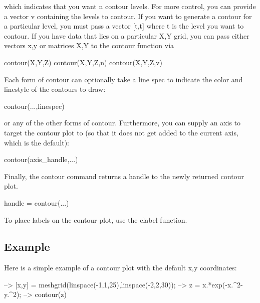  which indicates that you want {\ttfamily n} contour levels. For more control, you can provide a vector {\ttfamily v} containing the levels to contour. If you want to generate a contour for a particular level, you must pass a vector {\ttfamily \mbox{[}t,t\mbox{]}} where {\ttfamily t} is the level you want to contour. If you have data that lies on a particular {\ttfamily X,Y} grid, you can pass either vectors {\ttfamily x,y} or matrices {\ttfamily X,Y} to the contour function via \begin{DoxyVerb}  contour(X,Y,Z)
  contour(X,Y,Z,n)
  contour(X,Y,Z,v)
\end{DoxyVerb}
 Each form of {\ttfamily contour} can optionally take a line spec to indicate the color and linestyle of the contours to draw\-: \begin{DoxyVerb}  contour(...,linespec)
\end{DoxyVerb}
 or any of the other forms of {\ttfamily contour}. Furthermore, you can supply an axis to target the {\ttfamily contour} plot to (so that it does not get added to the current axis, which is the default)\-: \begin{DoxyVerb}  contour(axis_handle,...)
\end{DoxyVerb}
 Finally, the {\ttfamily contour} command returns a handle to the newly returned contour plot. \begin{DoxyVerb}  handle = contour(...)
\end{DoxyVerb}
 To place labels on the contour plot, use the {\ttfamily clabel} function. \hypertarget{variables_struct_Example}{}\subsection{Example}\label{variables_struct_Example}
Here is a simple example of a contour plot with the default {\ttfamily x,y} coordinates\-:


\begin{DoxyVerbInclude}
--> [x,y] = meshgrid(linspace(-1,1,25),linspace(-2,2,30));
--> z = x.*exp(-x.^2-y.^2);
--> contour(z)
\end{DoxyVerbInclude}


